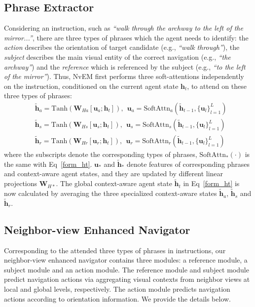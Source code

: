 \documentclass[sigconf]{acmart}
\begin{document}
\subsection{Phrase Extractor}\label{sec_extractor}
Considering an instruction, such as \textit{``walk through the archway to the left of the mirror...''}, there are three types of phrases which the agent needs to identify: the \textit{action} describes the orientation of target candidate (e.g., \textit{``walk through''}), the \textit{subject} describes the main visual entity of the correct navigation (e.g., \textit{``the archway''}) and the \textit{reference} which is referenced by the subject (e.g., \textit{``to the left of the mirror''}). 
Thus, NvEM first performs three soft-attentions independently on the instruction, conditioned on the current agent state $\mathbf{h}_t$, to attend on these three types of phrases:
\begin{equation}
	\begin{aligned}
		&\tilde{\mathbf{h}}_a=\textrm{Tanh}(\mathbf{W}_{Ha}[\mathbf{u}_a;\mathbf{h}_t]),\ \
		\mathbf{u}_a=\textrm{SoftAttn}_a(\tilde{\mathbf{h}}_{t-1},\{\mathbf{u}_{l}\}_{l=1}^{L}) \\
		&\tilde{\mathbf{h}}_s=\textrm{Tanh}(\mathbf{W}_{Hs}[\mathbf{u}_s;\mathbf{h}_t]),\ \
		\mathbf{u}_s=\textrm{SoftAttn}_s(\tilde{\mathbf{h}}_{t-1},\{\mathbf{u}_{l}\}_{l=1}^{L}) \\
		&\tilde{\mathbf{h}}_r=\textrm{Tanh}(\mathbf{W}_{Hr}[\mathbf{u}_r;\mathbf{h}_t]),\ \
		\mathbf{u}_r=\textrm{SoftAttn}_r(\tilde{\mathbf{h}}_{t-1},\{\mathbf{u}_{l}\}_{l=1}^{L})
	\end{aligned}
\end{equation}
where the subscripts denote the corresponding types of phrases, $\textrm{SoftAttn}_*(\cdot)$ is the same with Eq~\eqref{form_ht}. $\mathbf{u}_*$ and $\mathbf{\tilde{h}}_*$ denote features of corresponding phrases and context-aware agent states, and they are updated by different linear projections $\mathbf{W}_{H*}$. The global context-aware agent state $\mathbf{\tilde{h}}_t$ in Eq~\eqref{form_ht} is now calculated by averaging the three specialized context-aware states $\mathbf{\tilde{h}}_a$, $\mathbf{\tilde{h}}_s$ and $\mathbf{\tilde{h}}_r$.


\subsection{Neighbor-view Enhanced Navigator}
\label{sec_predictor}
Corresponding to the attended three types of phrases in instructions, our neighbor-view enhanced navigator contains three modules: a reference module, a subject module and an action module. The reference module and subject module predict navigation actions via aggregating visual contexts from neighbor views at local and global levels, respectively. The action module predicts navigation actions according to orientation information. We provide the details below. 
\end{document}
